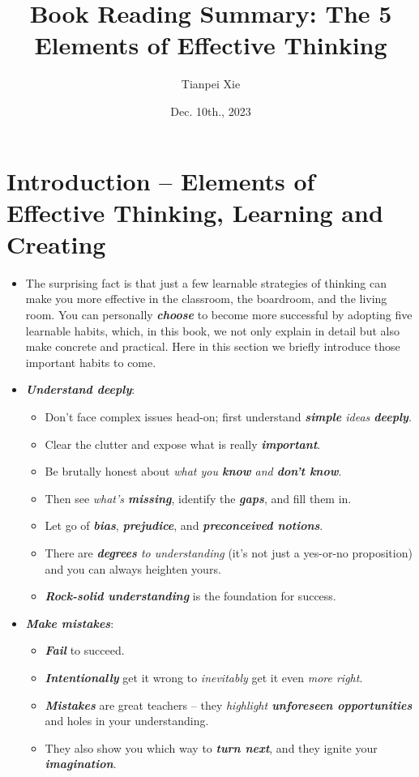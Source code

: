 \documentclass[11pt]{article}
\begin{document}
\title{Book Reading Summary: The 5 Elements of Effective Thinking}
\author{ Tianpei Xie}
\date{Dec. 10th., 2023}
\maketitle
\tableofcontents
\newpage
\section{Introduction -- Elements of Effective Thinking, Learning and Creating}
\begin{itemize}
\item The surprising fact is that just a few learnable strategies of thinking can make you more effective in the classroom, the boardroom, and the living room. You can personally \emph{\textbf{choose}} to become more successful by adopting five learnable habits, which, in this book, we not only explain in detail but also make concrete and practical. Here in this section we briefly introduce those important habits to come.

\item \emph{\textbf{Understand deeply}}:
\begin{itemize}
\item Don’t face complex issues head-on; first understand \emph{\textbf{simple} ideas \textbf{deeply}}. 
\item Clear the clutter and expose what is really \emph{\textbf{important}}. 
\item Be brutally honest about \emph{what you \textbf{know} and \textbf{don’t know}}. 
\item Then see \emph{what’s \textbf{missing}}, identify the \emph{\textbf{gaps}}, and fill them in. 
\item Let go of \emph{\textbf{bias}}, \emph{\textbf{prejudice}}, and \emph{\textbf{preconceived notions}}. 
\item There are \emph{\textbf{degrees} to understanding} (it’s not just a yes-or-no proposition) and you can always heighten yours. 
\item \emph{\textbf{Rock-solid understanding}} is the foundation for success.
\end{itemize}

\item \emph{\textbf{Make mistakes}}:
\begin{itemize}
\item \emph{\textbf{Fail}} to succeed. 
\item \emph{\textbf{Intentionally}} get it wrong to \emph{inevitably} get it even \emph{more right}. 
\item \emph{\textbf{Mistakes}} are great teachers -- they \emph{highlight \textbf{unforeseen opportunities}} and holes in your understanding. 
\item They also show you which way to \emph{\textbf{turn next}}, and they ignite your \emph{\textbf{imagination}}.
\end{itemize}


\end{itemize}
\end{document}
